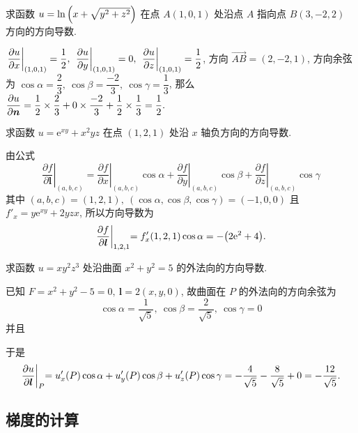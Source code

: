 \begin{example}[1996 数一]
    求函数 $u=\ln\qty(x+\sqrt{y^2+z^2})$ 在点 $A(1,0,1)$ 处沿点 $A$ 指向点 $B(3,-2,2)$ 方向的方向导数.
\end{example}
\begin{solution}
    $\displaystyle \eval{\pdv{u}{x}}_{(1,0,1)}=\dfrac{1}{2},~\eval{\pdv{u}{y}}_{(1,0,1)}=0,~\eval{\pdv{u}{z}}_{(1,0,1)}=\dfrac{1}{2}$, 方向 $\overrightarrow{AB}=(2,-2,1)$, 
    方向余弦为 $\cos\alpha=\dfrac{2}{3},~\cos\beta=\dfrac{-2}{3},~\cos\gamma=\dfrac{1}{3}$, 那么 $\displaystyle\pdv{u}{\vb*{n}}=\dfrac{1}{2}\times\dfrac{2}{3}+0\times\dfrac{-2}{3}+\dfrac{1}{2}\times\dfrac{1}{3}=\dfrac{1}{2}.$
\end{solution}

\begin{example}
    求函数 $u=\mathrm{e}^{xy}+x^2yz$ 在点 $(1,2,1)$ 处沿 $x$ 轴负方向的方向导数.
\end{example}
\begin{solution}
    由公式
    $$\left.\frac{\partial f}{\partial\boldsymbol{l}}\right|_{(a, b, c)}=\left.\frac{\partial f}{\partial x}\right|_{(a, b, c)} \cos \alpha+\left.\frac{\partial f}{\partial y}\right|_{(a, b, c)} \cos \beta+\left.\frac{\partial f}{\partial z}\right|_{(a, b, c)} \cos \gamma$$
    其中 $(a,b,c)=(1,2,1),~(\cos\alpha,\cos\beta,\cos\gamma)=(-1,0,0)$ 且 $f'_x=y\mathrm{e}^{xy}+2yzx$, 所以方向导数为 
    $$\pdv{f}{\boldsymbol{l}}\biggl |_{1,2,1}=f'_x(1,2,1)\cos\alpha=-\qty(2\mathrm{e}^2+4).$$
\end{solution}

\begin{example}
    求函数 $u=xy^2z^3$ 处沿曲面 $x^2+y^2=5$ 的外法向的方向导数.
\end{example}
\begin{solution}
    已知 $F=x^2+y^2-5=0,~\boldsymbol{l}=2(x,y,0)$, 故曲面在 $P$ 的外法向的方向余弦为
    $$\cos\alpha=\dfrac{1}{\sqrt{5}},~\cos\beta=\dfrac{2}{\sqrt{5}},~\cos\gamma=0$$
    并且
    于是 $$\pdv{u}{\boldsymbol{l}}\biggl |_P=u'_x(P)\cos\alpha+u'_y(P)\cos\beta+u'_z(P)\cos\gamma=-\dfrac{4}{\sqrt{5}}-\dfrac{8}{\sqrt{5}}+0=-\dfrac{12}{\sqrt{5}}.$$
\end{solution}

\subsection{梯度的计算}

